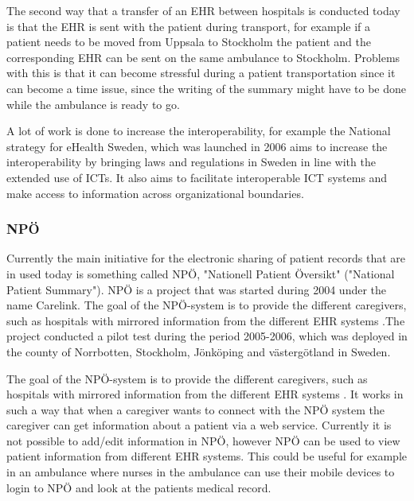 \documentclass[14pt]{article}
\begin{document}
The second way that a transfer of an \gls{EHR} between hospitals is conducted today is that the \gls{EHR} is sent with the patient during transport, for example if a patient needs to be moved from Uppsala to Stockholm the patient and the corresponding \gls{EHR} can be sent on the same ambulance to Stockholm\cite{EPJ2}. Problems with this is that it can become stressful during a patient transportation since it can become a time issue, since the writing of the summary might have to be done while the ambulance is ready to go\cite{EPJ2}.


A lot of work is done to increase the \gls{interoperability}, for example the National strategy for eHealth Sweden, which was launched in 2006 aims to increase the interoperability by bringing laws and regulations in Sweden in line with the extended use of \glspl{ICT}. It also aims to facilitate interoperable \gls{ICT} systems and make access to information across organizational boundaries\cite{NationalStrategy}. 

\subsubsection{NPÖ} %
Currently the main initiative for the electronic sharing of patient records that are in used today is something called NPÖ, "Nationell Patient Översikt" ("National Patient Summary"). NPÖ is a project that was started during 2004 under the name Carelink\cite{ViktorJernelov}. The goal of the NPÖ-system is to provide the different caregivers, such as hospitals with mirrored information from the different \gls{EHR} systems \cite{ViktorJernelov}.The project conducted a pilot test during the period 2005-2006, which was deployed in the county of Norrbotten, Stockholm, Jönköping and västergötland in Sweden.

The goal of the NPÖ-system is to provide the different caregivers, such as hospitals with mirrored information from the different \gls{EHR} systems \cite{ViktorJernelov}. It works in such a way that when a caregiver wants to connect with the NPÖ system the caregiver can get information about a patient via a web service. Currently it is not possible to add/edit information in NPÖ, however NPÖ can be used to view patient information from different \gls{EHR} systems. This could be useful for example in an ambulance where nurses in the ambulance can use their mobile devices to login to NPÖ and look at the patients medical record.  
\end{document}
